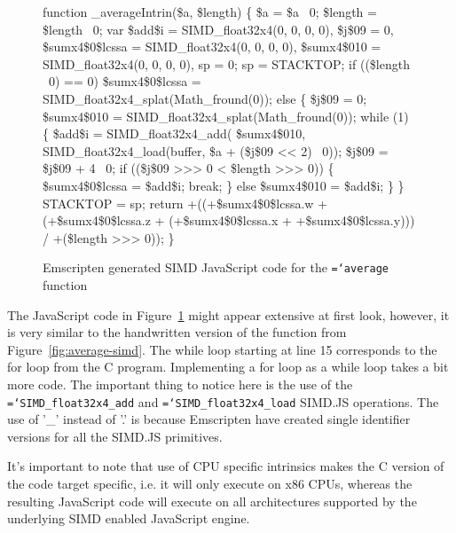 \documentclass[preprint]{sigplanconf}
\newcommand{\ttt}[1]{{\texttt{\hyphenchar\font=`\-\relax #1}}}%
\begin{document}
\begin{figure}
\begin{small}
\begin{program}[style=tt, number=true]
fu\tab{}nction \_averageIntrin(\$a, \$length) \{
  \$a = \$a \textbar\ 0;
  \$length = \$length \textbar\ 0;
  var \tab{}\$add\$i = SIMD\_float32x4(0, 0, 0, 0),
      \$j\$09 = 0,
      \$sumx4\$0\$lcssa = SIMD\_float32x4(0, 0, 0, 0),
      \$sumx4\$010 = SIMD\_float32x4(0, 0, 0, 0),
      sp = 0;\untab{}
  sp = STACKTOP;
  if\tab{} ((\$length \textbar\ 0) == 0)
    \$sumx4\$0\$lcssa = SIMD\_float32x4\_splat(Math\_fround(0));\untab{}
  el\tab{}se \{
    \$j\$09 = 0;
    \$sumx4\$010 = SIMD\_float32x4\_splat(Math\_fround(0));
    whi\tab{}le (1) \{
      \$a\tab{}dd\$i =
        SI\tab{}MD\_float32x4\_add(
          \$sumx4\$010,
          SIMD\_float32x4\_load(buffer, \$a + (\$j\$09 << 2) \textbar\ 0));\untab{}\untab{}
      \$j\$09 = \$j\$09 + 4 \textbar\ 0;
      if\tab{} (\!(\$j\$09 >>> 0 < \$length >>> 0)) \{
        \$sumx4\$0\$lcssa = \$add\$i;
        break;\untab{}
      \} else \$sumx4\$010 = \$add\$i;\untab{}
    \}\untab{}
  \}
  STACKTOP = sp;
  return\tab{} +((+\$sumx4\$0\$lcssa.w + (+\$sumx4\$0\$lcssa.z +
        (+\$sumx4\$0\$lcssa.x + +\$sumx4\$0\$lcssa.y))) /
        +(\$length >>> 0));\untab{}\untab{}
\}
\end{program}
\end{small}
\caption{Emscripten generated SIMD JavaScript code for the \ttt{average} function}
\label{fig:average-intrin-js}
\end{figure}

The JavaScript code in Figure~\ref{fig:average-intrin-js} might appear
extensive at first look, however, it is very similar to the handwritten
version of the function from Figure~\ref{fig:average-simd}.  The while loop
starting at line 15 corresponds to the for loop from the C program.  Implementing
a for loop as a while loop takes a bit more code.  The important thing to notice
here is the use of the \ttt{SIMD\_float32x4\_add} and \ttt{SIMD\_float32x4\_load}
SIMD.JS operations.  The use of '\_' instead of '.' is because Emscripten have
created single identifier versions for all the SIMD.JS primitives.

It's important to note that use of CPU specific intrinsics makes the C version
of the code target specific, i.e. it will only execute on x86 CPUs, whereas the
resulting JavaScript code will execute on all architectures supported by the
underlying SIMD enabled JavaScript engine.
\end{document}
